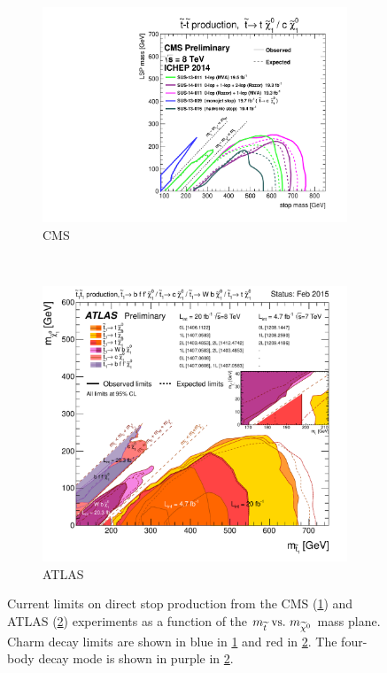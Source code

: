 \begin{figure}[h!]
  \centering
  \begin{subfigure}[b]{0.7\textwidth}
    \includegraphics[width=\textwidth]{Figs/other_limits/T2tt_ICHEP2014_All.pdf}
    \caption{CMS}
    \label{fig:cms_current_limit}
  \end{subfigure}\\
  \vspace{0.5cm}\begin{subfigure}[b]{0.7\textwidth}
    \includegraphics[width=\textwidth]{Figs/other_limits/ATLAS_SUSY_Stop_tLSP.pdf}
    \caption{ATLAS}
    \label{fig:atlas_current_limit}
  \end{subfigure}
  \caption{Current limits on direct stop production from the CMS
  (\ref{fig:cms_current_limit})\cite{cmssusyresults} and ATLAS
  (\ref{fig:atlas_current_limit})\cite{atlassusyresults}
  experiments as a function of the $m_{\widetilde{t}} \text{ vs.\ } m_{\widetilde{\chi}^{0}}$ mass
  plane. Charm decay limits are shown in blue in \ref{fig:cms_current_limit}
  and red in \ref{fig:atlas_current_limit}. The four-body decay mode is shown
  in purple in \ref{fig:atlas_current_limit}.}
  \label{fig:current_limits}
\end{figure}

